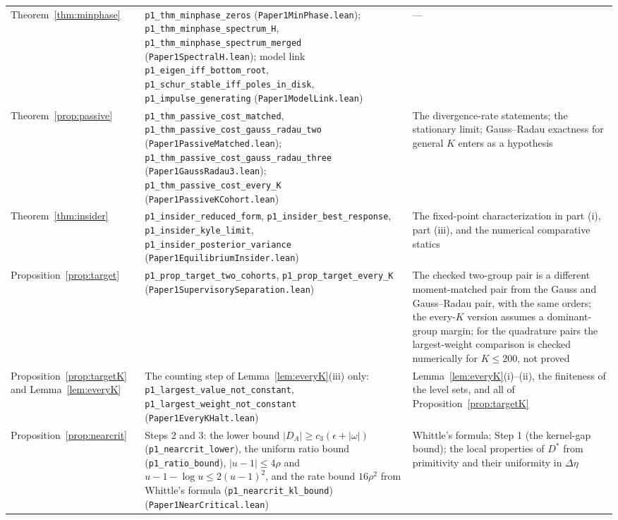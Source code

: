 \documentclass[12pt]{article}
\theoremstyle{definition}
\theoremstyle{remark}
\begin{document}
\begin{longtable}{>{\raggedright\arraybackslash}p{}>{\raggedright\arraybackslash}p{}>{\raggedright\arraybackslash}p{}}
Theorem~\ref{thm:minphase} & \texttt{p1\_thm\_minphase\_zeros} (\nolinkurl{Paper1MinPhase.lean}); \texttt{p1\_thm\_minphase\_spectrum\_H}, \texttt{p1\_thm\_minphase\_spectrum\_merged} (\nolinkurl{Paper1SpectralH.lean}); model link \texttt{p1\_eigen\_iff\_bottom\_root}, \texttt{p1\_schur\_stable\_iff\_poles\_in\_disk}, \texttt{p1\_impulse\_generating} (\nolinkurl{Paper1ModelLink.lean}) & ---\\
Theorem~\ref{prop:passive} & \texttt{p1\_thm\_passive\_cost\_matched}, \texttt{p1\_thm\_passive\_cost\_gauss\_radau\_two} (\nolinkurl{Paper1PassiveMatched.lean}); \nolinkurl{p1_thm_passive_cost_gauss_radau_three} (\nolinkurl{Paper1GaussRadau3.lean}); \texttt{p1\_thm\_passive\_cost\_every\_K} (\nolinkurl{Paper1PassiveKCohort.lean}) & The divergence-rate statements; the stationary limit; Gauss--Radau exactness for general $K$ enters as a hypothesis\\
Theorem~\ref{thm:insider} & \texttt{p1\_insider\_reduced\_form}, \texttt{p1\_insider\_best\_response}, \texttt{p1\_insider\_kyle\_limit}, \texttt{p1\_insider\_posterior\_variance} (\nolinkurl{Paper1EquilibriumInsider.lean}) & The fixed-point characterization in part (i), part (iii), and the numerical comparative statics\\
Proposition~\ref{prop:target} & \texttt{p1\_prop\_target\_two\_cohorts}, \texttt{p1\_prop\_target\_every\_K} (\nolinkurl{Paper1SupervisorySeparation.lean}) & The checked two-group pair is a different moment-matched pair from the Gauss and Gauss--Radau pair, with the same orders; the every-$K$ version assumes a dominant-group margin; for the quadrature pairs the largest-weight comparison is checked numerically for $K\le200$, not proved\\
Proposition~\ref{prop:targetK} and Lemma~\ref{lem:everyK} & The counting step of Lemma~\ref{lem:everyK}(iii) only: \texttt{p1\_largest\_value\_not\_constant}, \texttt{p1\_largest\_weight\_not\_constant} (\nolinkurl{Paper1EveryKHalt.lean}) & Lemma~\ref{lem:everyK}(i)--(ii), the finiteness of the level sets, and all of Proposition~\ref{prop:targetK}\\
Proposition~\ref{prop:nearcrit} & Steps 2 and 3: the lower bound $|D_A|\ge c_3(\epsilon+|\omega|)$ (\texttt{p1\_nearcrit\_lower}), the uniform ratio bound (\texttt{p1\_ratio\_bound}), $|u-1|\le4\rho$ and $u-1-\log u\le2(u-1)^2$, and the rate bound $16\rho^2$ from Whittle's formula (\texttt{p1\_nearcrit\_kl\_bound}) (\nolinkurl{Paper1NearCritical.lean}) & Whittle's formula; Step 1 (the kernel-gap bound); the local properties of $D^*$ from primitivity and their uniformity in $\Delta\eta$\\

\end{longtable}
\end{document}
